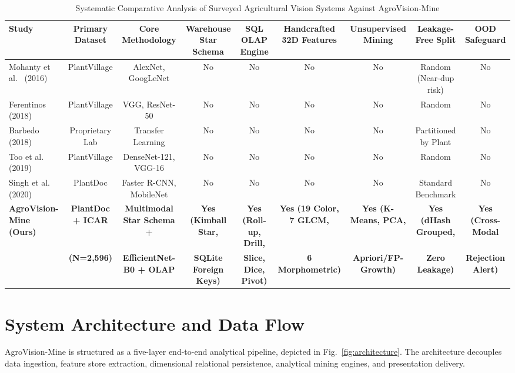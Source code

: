 \documentclass[conference]{IEEEtran}
\begin{document}
\begin{table}[t]
\caption{Systematic Comparative Analysis of Surveyed Agricultural Vision Systems Against AgroVision-Mine}
\label{tab:literature_comparison}
\centering
\scriptsize
\begin{tabularx}{\textwidth}{lcccccccc}
\toprule
\textbf{Study} & \textbf{Primary Dataset} & \textbf{Core Methodology} & \textbf{Warehouse Star Schema} & \textbf{SQL OLAP Engine} & \textbf{Handcrafted 32D Features} & \textbf{Unsupervised Mining} & \textbf{Leakage-Free Split} & \textbf{OOD Safeguard} \\
\midrule
Mohanty et al.~\cite{mohanty2016deep} (2016) & PlantVillage & AlexNet, GoogLeNet & No & No & No & No & Random (Near-dup risk) & No \\
Ferentinos~\cite{ferentinos2018deep} (2018) & PlantVillage & VGG, ResNet-50 & No & No & No & No & Random & No \\
Barbedo~\cite{barbedo2018impact} (2018) & Proprietary Lab & Transfer Learning & No & No & No & No & Partitioned by Plant & No \\
Too et al.~\cite{too2019comparative} (2019) & PlantVillage & DenseNet-121, VGG-16 & No & No & No & No & Random & No \\
Singh et al.~\cite{singh2020plantdoc} (2020) & PlantDoc & Faster R-CNN, MobileNet & No & No & No & No & Standard Benchmark & No \\
\textbf{AgroVision-Mine (Ours)} & \textbf{PlantDoc + ICAR} & \textbf{Multimodal Star Schema +} & \textbf{Yes (Kimball Star,} & \textbf{Yes (Roll-up, Drill,} & \textbf{Yes (19 Color, 7 GLCM,} & \textbf{Yes (K-Means, PCA,} & \textbf{Yes (dHash Grouped,} & \textbf{Yes (Cross-Modal} \\
& \textbf{(N=2,596)} & \textbf{EfficientNet-B0 + OLAP} & \textbf{SQLite Foreign Keys)} & \textbf{Slice, Dice, Pivot)} & \textbf{6 Morphometric)} & \textbf{Apriori/FP-Growth)} & \textbf{Zero Leakage)} & \textbf{Rejection Alert)} \\
\bottomrule
\end{tabularx}
\end{table}

\section{System Architecture and Data Flow}
AgroVision-Mine is structured as a five-layer end-to-end analytical pipeline, depicted in Fig.~\ref{fig:architecture}. The architecture decouples data ingestion, feature store extraction, dimensional relational persistence, analytical mining engines, and presentation delivery.
\end{document}

